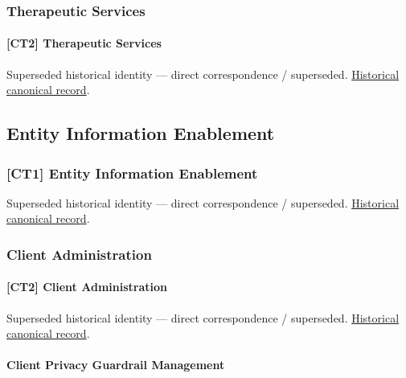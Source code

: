 \subsubsection{Therapeutic Services}

\paragraph{[CT2] Therapeutic Services}

\par\label{element:54032b52ee444bfe8b611fb9e8e2ba10}
Superseded historical identity — direct correspondence / superseded. \href{../../../../continuum/strategy/capability/54032b52ee444bfe8b611fb9e8e2ba10.md}{Historical canonical record}.\par

\subsection{Entity Information Enablement}

\subsubsection{[CT1] Entity Information Enablement}

\par\label{element:e4d959d6c71d498c9ce00d2be4c048e3}
Superseded historical identity — direct correspondence / superseded. \href{../../../../continuum/strategy/capability/e4d959d6c71d498c9ce00d2be4c048e3.md}{Historical canonical record}.\par

\subsubsection{Client Administration}

\paragraph{[CT2] Client Administration}

\par\label{element:70d2a44a0442441f8b306b82b297bb8a}
Superseded historical identity — direct correspondence / superseded. \href{../../../../continuum/strategy/capability/70d2a44a0442441f8b306b82b297bb8a.md}{Historical canonical record}.\par

\paragraph{Client Privacy Guardrail Management}

